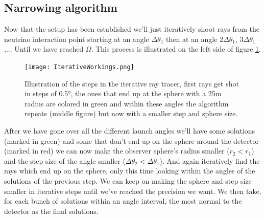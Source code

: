 \subsection{Narrowing algorithm}
Now that the setup has been established we'll just iteratively shoot rays from the neutrino
interaction point starting at an angle $\Delta \theta_1$ then at an angle
$2\Delta \theta_1$, $3\Delta \theta_1$,... Until we have reached $\Omega$. This
process is illustrated on the left side of figure \ref{fig:IterativeWorkings}.
\begin{figure}
  \centering
  \texttt{[image: IterativeWorkings.png]}
  \caption{Illustration of the steps in the iterative ray tracer, first rays get shot in steps of 0.5°, the ones that end up at the sphere with a 25m radius are colored in green and within these angles the algorithm repeats (middle figure) but now with a smaller
  step and sphere size.  }
  \label{fig:IterativeWorkings}
\end{figure}
After we have gone over all the different launch angles we'll have some
solutions (marked in green) and some that don't end up on the sphere around the detector (marked
in red) we can now make the observer sphere's radius smaller ($r_2 < r_1$) and
the step size of the angle smaller ($\Delta \theta_2 < \Delta \theta_1$).  And
again iteratively find the rays which end up on the sphere, only this time
looking within the angles of the solutions of the previous step. We can keep on
making the sphere and step size smaller in iterative steps until we've reached
the precision we want. We then take, for each bunch of solutions within an
angle interval, the most normal to the detector as the final solutions.



